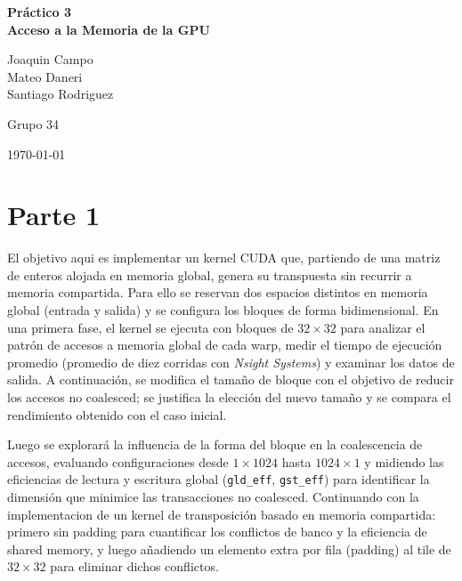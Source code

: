 \documentclass[a4paper,11pt]{article}
\begin{document}
\begin{titlepage}
  \thispagestyle{empty}     %
  \centering
  \vspace*{2cm}

  {\Huge\bfseries Práctico 3\\[0.5em]
   Acceso a la Memoria de la GPU\par}
  \vspace{1.5cm}
  \vfill                %

  {\Large
   Joaquin Campo\\
   Mateo Daneri\\
   Santiago Rodriguez\par}
  \vspace{1em}
  {\Large Grupo 34\par}

  \vspace{2cm}
  {\large \today\par}
\end{titlepage}

\section{Parte 1}
El objetivo aqui es implementar un kernel CUDA que, partiendo de una matriz de enteros alojada en memoria global, genera su transpuesta sin recurrir a memoria compartida. Para ello se reservan dos espacios distintos en memoria global (entrada y salida) y se configura los bloques de forma bidimensional. En una primera fase, el kernel se ejecuta con bloques de $32\times 32$ para analizar el patrón de accesos a memoria global de cada warp, medir el tiempo de ejecución promedio (promedio de diez corridas con \textit{Nsight Systems}) y examinar los datos de salida. A continuación, se modifica el tamaño de bloque con el objetivo de reducir los accesos no coalesced; se justifica la elección del nuevo tamaño y se compara el rendimiento obtenido con el caso inicial.

Luego se explorará la influencia de la forma del bloque en la coalescencia de accesos, evaluando configuraciones desde \(1\times1024\) hasta \(1024\times1\) y midiendo las eficiencias de lectura y escritura global (\texttt{gld\_eff}, \texttt{gst\_eff}) para identificar la dimensión que minimice las transacciones no coalesced. Continuando con la implementacion de un kernel de transposición basado en memoria compartida: primero sin padding para cuantificar los conflictos de banco y la eficiencia de shared memory, y luego añadiendo un elemento extra por fila (padding) al tile de \(32\times32\) para eliminar dichos conflictos.
\end{document}
